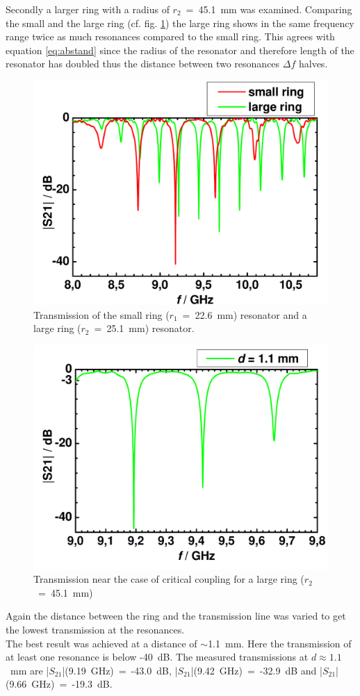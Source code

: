 Secondly a larger ring with a radius of $r_2$~=~45.1~mm was examined. Comparing the small and the large ring (cf. fig. \ref{fig:04_vergleich}) the large ring shows in the same frequency range twice as much resonances compared to the small ring. This agrees with equation \eqref{eq:abstand} since the  radius of the resonator and therefore length of the resonator has doubled thus the distance between two resonances $\Delta f$ halves.
\begin{figure}%
\centering
\includegraphics[width=.6\columnwidth]{Grafiken/04_vergleich.pdf}%
\caption{Transmission of the small ring ($r_1$~=~22.6~mm) resonator and a large ring ($r_2$~=~25.1~mm)  resonator.}%
\label{fig:04_vergleich}%
\end{figure}

\begin{figure}%
\centering
\includegraphics[width=.6\columnwidth]{Grafiken/05_11.pdf}%
\caption{Transmission near the case of critical coupling for a large ring ($r_2$~=~45.1~mm)}%
\label{fig:05_11}%
\end{figure}
Again the distance between the ring and the transmission line was varied to get the lowest transmission at the resonances. \\The best result was achieved at a distance of $\sim$1.1~mm. Here the transmission of at least one resonance is below \mbox{-40~dB}.
The measured transmissions at $d \approx 1.1$~mm are |$S_{21}$|(9.19~GHz)~=~\mbox{-43.0~dB}, |$S_{21}$|(9.42~GHz)~=~\mbox{-32.9~dB} and |$S_{21}$|(9.66~GHz)~=~-19.3~dB.

